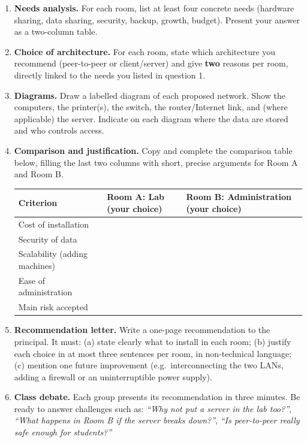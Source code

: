 \documentclass[11pt]{article}
\begin{document}
\begin{enumerate}
\item \textbf{Needs analysis.} For each room, list at least four concrete needs (hardware sharing, data sharing, security, backup, growth, budget). Present your answer as a two-column table.

\item \textbf{Choice of architecture.} For each room, state which architecture you recommend (peer-to-peer or client/server) and give \textbf{two} reasons per room, directly linked to the needs you listed in question 1.

\item \textbf{Diagrams.} Draw a labelled diagram of each proposed network. Show the computers, the printer(s), the switch, the router/Internet link, and (where applicable) the server. Indicate on each diagram where the data are stored and who controls access.

\item \textbf{Comparison and justification.} Copy and complete the comparison table below, filling the last two columns with short, precise arguments for Room A and Room B.

\begin{center}
\begin{tabularx}{\linewidth}{|l|X|X|}
\hline
\rowcolor{popblueL} \textbf{Criterion} & \textbf{Room A: Lab (your choice)} & \textbf{Room B: Administration (your choice)} \\
\hline
Cost of installation & & \\
\hline
Security of data & & \\
\hline
Scalability (adding machines) & & \\
\hline
Ease of administration & & \\
\hline
Main risk accepted & & \\
\hline
\end{tabularx}
\end{center}

\item \textbf{Recommendation letter.} Write a one-page recommendation to the principal. It must: (a) state clearly what to install in each room; (b) justify each choice in at most three sentences per room, in non-technical language; (c) mention one future improvement (e.g.\ interconnecting the two LANs, adding a firewall or an uninterruptible power supply).

\item \textbf{Class debate.} Each group presents its recommendation in three minutes. Be ready to answer challenges such as: \emph{``Why not put a server in the lab too?''}, \emph{``What happens in Room B if the server breaks down?''}, \emph{``Is peer-to-peer really safe enough for students?''}
\end{enumerate}
\end{document}
